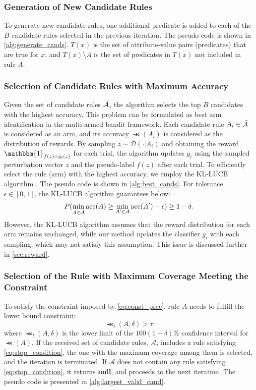 \documentclass[11pt]{article}
\begin{document}
\subsubsection{Generation of New Candidate Rules}
To generate new candidate rules,
one additional predicate is added to each of the $B$ candidate rules
selected in the previous iteration.
The pseudo code is shown in \cref{alg:generate_cands}.
$T(x)$ is the set of attribute-value pairs (predicates) that are true for $x$,
and $T(x)\setminus A$ is the set of predicates in $T(x)$ not included in rule $A$.

\subsubsection{Selection of Candidate Rules with Maximum Accuracy}
Given the set of candidate rules $\bar{\mathcal{A}}$,
the algorithm selects the top $B$ candidates with the highest accuracy.
This problem can be formulated
as best arm identification in the multi-armed bandit framework.
Each candidate rule $A_i\in\bar{\mathcal{A}}$ is considered as an arm,
and its accuracy $\Prec(A_i)$ is considered as the distribution of rewards.
By sampling $z\sim\mathcal{D}(\cdot|A_i)$
and obtaining the reward $\mathbbm{1}_{f(z)=g_i(z)}$ for each trial,
the algorithm updates $g_i$ using the sampled perturbation vector $z$
and the pseudo-label $f(z)$ after each trial.
To efficiently select the rule (arm) with the highest accuracy,
we employ the KL-LUCB algorithm \cite{kaufmann2013information}.
The pseudo code is shown in \cref{alg:best_cands}.
For tolerance $\epsilon\in[0,1]$, the KL-LUCB algorithm guarantees below:
\begin{equation}
  P(\underset{A\in\bar{\mathcal{A}}}{\min}\operatorname{acc}(A)\ge
  \underset{A'\in\mathcal{A}}{\min}\operatorname{acc}(A')-\epsilon)\ge1-\delta.
\end{equation}
However,
the KL-LUCB algorithm assumes that the reward distribution for each arm
remains unchanged,
while our method updates the classifier $g_i$ with each sampling,
which may not satisfy this assumption.
This issue is discussed further in \cref{sec:reward}.

\subsubsection{Selection of the Rule with Maximum Coverage Meeting the Constraint}
To satisfy the constraint imposed by \cref{eq:const_prec}, rule $A$ needs to fulfill the lower bound constraint:
\begin{equation}
  \Prec_{l}(A,\delta)>\tau
  \label{eq:stop_condition}
\end{equation}
where $\Prec_{l}(A,\delta)$ is the lower limit of
the $100(1-\delta)$\% confidence interval for $\Prec(A)$.
If the received set of candidate rules, $\mathcal{A}$,
includes a rule satisfying \cref{eq:stop_condition},
the one with the maximum coverage among them is selected,
and the iteration is terminated.
If $\mathcal{A}$ does not contain any rule satisfying \cref{eq:stop_condition},
it returns \textbf{null},
and proceeds to the next iteration.
The pseudo code is presented in \cref{alg:largest_valid_cand}.
\end{document}

